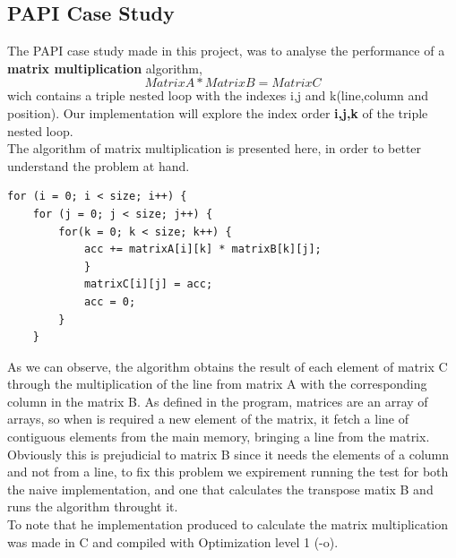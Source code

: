 \documentclass[twoside]{article}
\begin{document}
\begin{multicols}{2}

\section{PAPI Case Study}

The PAPI case study made in this project, was to analyse the performance of a \textbf{matrix multiplication} algorithm, \begin{equation}Matrix A * Matrix B = Matrix C\end{equation} wich contains a triple nested loop with the indexes i,j and k(line,column and position). Our implementation will explore the index order \textbf{i,j,k} of the triple nested loop.\\
The algorithm of matrix multiplication is presented here, in order to better understand the problem at hand.\\

\begin{verbatim}
for (i = 0; i < size; i++) {
    for (j = 0; j < size; j++) {
        for(k = 0; k < size; k++) {
            acc += matrixA[i][k] * matrixB[k][j];				
            }		
            matrixC[i][j] = acc;	
            acc = 0;
        }
    }
\end{verbatim}

As we can observe, the algorithm obtains the result of each element of matrix C through the multiplication of the line from matrix A with the corresponding column in the matrix B. As defined in the program, matrices are an array of arrays, so when is required a new element of the matrix, it fetch a line of contiguous elements from the main memory, bringing a line from the matrix. Obviously this is prejudicial to matrix B since it needs the elements of a column and not from a line, to fix this problem we expirement running the test for both the naive implementation, and one that calculates the transpose matix B and runs the algorithm throught it.  \\
To note that he implementation produced to calculate the matrix multiplication was made in C and compiled with Optimization level 1 (-o).


\end{multicols}
\end{document}
